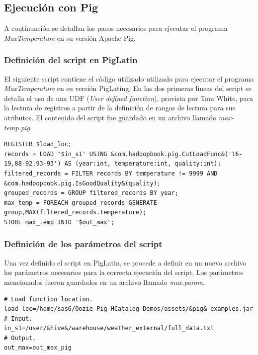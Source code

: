 \subsection{Ejecución con Pig}

A continuación se detallan los pasos necesarios para ejecutar el programa \textit{MaxTemperature} en su versión Apache Pig. \\

\subsubsection{Definición del script en PigLatin}

El siguiente script contiene el código utilizado utilizado para ejecutar el programa \textit{MaxTemperature} en su versión PigLating. En las dos primeras lineas del script se detalla el uso de una UDF (\textit{User defined function}), provista por Tom White, para la lectura de registros a partir de la definición de rangos de lectura para sus atributos. El contenido del script fue guardado en un archivo llamado \textit{max-temp.pig}.

\begin{lstlisting}[linewidth=\columnwidth,breaklines=true]
REGISTER $load_loc;
records = LOAD '$in_s1' USING &com.hadoopbook.pig.CutLoadFunc&('16-19,88-92,93-93') AS (year:int, temperature:int, quality:int); 
filtered_records = FILTER records BY temperature != 9999 AND &com.hadoopbook.pig.IsGoodQuality&(quality);
grouped_records = GROUP filtered_records BY year;
max_temp = FOREACH grouped_records GENERATE group,MAX(filtered_records.temperature);
STORE max_temp INTO '$out_max';   
\end{lstlisting} 


\subsubsection{Definición de los parámetros del script}

Una vez definido el script en PigLatin, se procede a definir en un nuevo archivo los parámetros necesarios para la correcta ejecución del script. Los parámetros mencionados fueron guardados en un archivo llamado \textit{max.param}.

\begin{lstlisting}[linewidth=\columnwidth,breaklines=true]
# Load function location.
load_loc=/home/sas6/Oozie-Pig-HCatalog-Demos/assets/&pig&-examples.jar
# Input.
in_s1=/user/&hive&/warehouse/weather_external/full_data.txt
# Output.
out_max=out_max_pig
\end{lstlisting}

